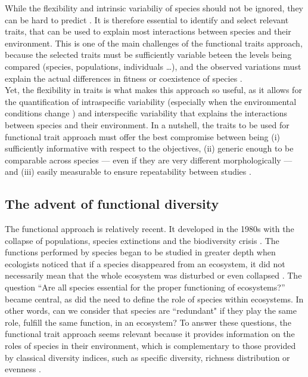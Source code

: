 While the flexibility and intrinsic variabiliy of species should not be ignored, they can be hard to predict \citep{diderich2006,martini2020}. It is therefore essential to identify and select relevant traits, that can be used to explain most interactions between species and their environment. This is one of the main challenges of the functional traits approach, because the selected traits must be sufficiently variable beteen the levels being compared (species, populations, individuals …), and the observed variations must explain the actual differences in fitness or coexistence of species \citep{kremer2017}. \\

Yet, the flexibility in traits is what makes this approach so useful, as it allows for the quantification of intraspecific variability (especially when the environmental conditions change \citet{martini2020}) and interspecific variability that explains the interactions between species and their environment. In a nutshell, the traits to be used for functional trait approach must offer the best compromise between being (i) sufficiently informative with respect to the objectives, (ii) generic enough to be comparable across species --- even if they are very different morphologically --- and (iii) easily measurable to ensure repeatability between studies \citep{dumay2004, kremer2017}.

\subsection{The advent of functional diversity}
The functional approach is relatively recent. It developed in the 1980s with the collapse of populations, species extinctions and the biodiversity crisis \citep{wilson1988}. The functions performed by species began to be studied in greater depth when ecologists noticed that if a species disappeared from an ecosystem, it did not necessarily mean that the whole ecosystem was disturbed or even collapsed \citep{mejri2009}. The question ``Are all species essential for the proper functioning of ecosystems?'' became central, as did the need to define the role of species within ecosystems. In other words, can we consider that species are ``redundant" if they play the same role, fulfill the same function, in an ecosystem? To answer these questions, the functional trait approach seems relevant because it provides information on the roles of species in their environment, which is complementary to those provided by classical diversity indices, such as specific diversity, richness distribution or evenness \citep{marcon2015,mejri2009}. 

